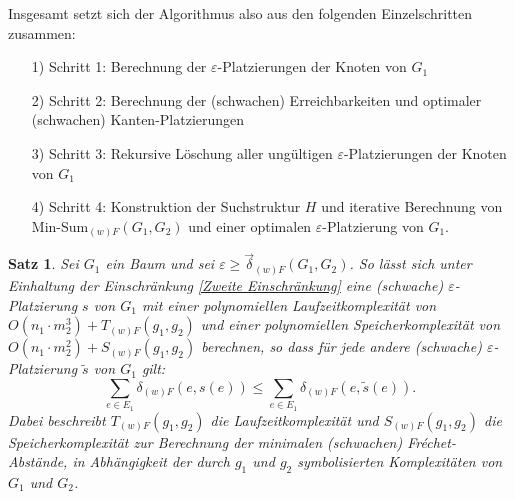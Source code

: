 \documentclass[a4paper, 12pt, twoside]{article}
\theoremstyle{Format1} %
\newtheorem{Satz}[Def]{Satz}                %
\begin{document}
Insgesamt setzt sich der Algorithmus also aus den folgenden Einzelschritten zusammen:
\begin{enumerate}
	\item[1)] Schritt 1: Berechnung der $\varepsilon$-Platzierungen der Knoten von $G_1$
	\item[2)] Schritt 2: Berechnung der (schwachen) Erreichbarkeiten und optimaler (schwachen) Kanten-Platzierungen
	\item[3)] Schritt 3: Rekursive Löschung aller ungültigen $\varepsilon$-Platzierungen der Knoten von $G_1$
	\item[4)] Schritt 4: Konstruktion der Suchstruktur $H$ und iterative Berechnung von Min-Sum$_{(w)F}(G_1, G_2)$ und einer optimalen $\varepsilon$-Platzierung von $G_1$.
\end{enumerate}

\begin{Satz}
	Sei $G_1$ ein Baum und sei $\varepsilon \geq \vec{\delta}_{(w)F}(G_1,G_2)$.
	So lässt sich unter Einhaltung der Einschränkung \ref{Zweite Einschränkung} eine (schwache) $\varepsilon$-Platzierung $s$ von $G_1$
	mit einer polynomiellen Laufzeitkomplexität von $O(n_1 \cdot m_2^3) + T_{(w)F}(g_1, g_2)$ und einer polynomiellen Speicherkomplexität von $O(n_1 \cdot m_2^2) + S_{(w)F}(g_1, g_2)$ berechnen, so dass für jede
	andere (schwache) $\varepsilon$-Platzierung $\tilde{s}$ von $G_1$ gilt:
	$$\sum_{e \in E_1}\delta_{(w)F}(e, s(e)) \leq \sum_{e \in E_1}\delta_{(w)F}(e, \tilde{s}(e)).$$
	Dabei beschreibt $T_{(w)F}(g_1, g_2)$ die Laufzeitkomplexität und $S_{(w)F}(g_1, g_2)$ die Speicherkomplexität zur Berechnung der minimalen (schwachen) Fréchet-Abstände, in Abhängigkeit
	der durch $g_1$ und $g_2$ symbolisierten Komplexitäten von $G_1$ und $G_2$.
\end{Satz}
\end{document}
